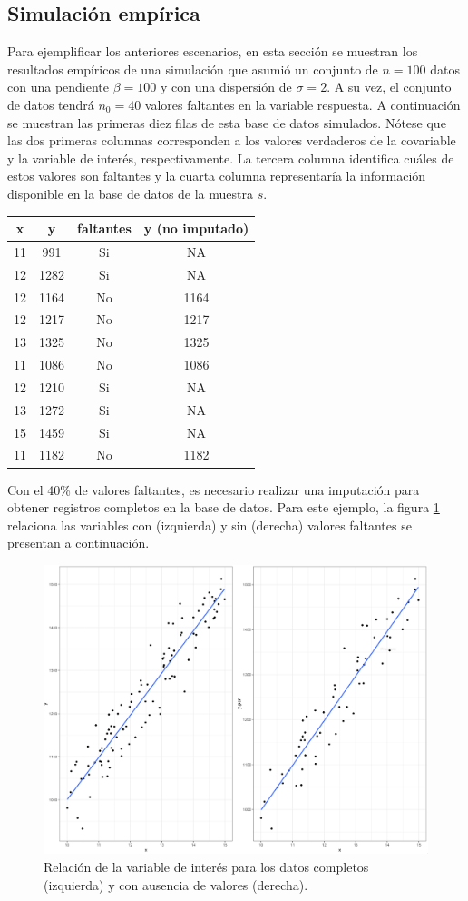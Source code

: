 \documentclass[
  12pt,
]{book}
\begin{document}
\hypertarget{simulaciuxf3n-empuxedrica}{%
\subsection{Simulación empírica}\label{simulaciuxf3n-empuxedrica}}

Para ejemplificar los anteriores escenarios, en esta sección se muestran los resultados empíricos de una simulación que asumió un conjunto de \(n = 100\) datos con una pendiente \(\beta = 100\) y con una dispersión de \(\sigma = 2\). A su vez, el conjunto de datos tendrá \(n_0 = 40\) valores faltantes en la variable respuesta. A continuación se muestran las primeras diez filas de esta base de datos simulados. Nótese que las dos primeras columnas corresponden a los valores verdaderos de la covariable y la variable de interés, respectivamente. La tercera columna identifica cuáles de estos valores son faltantes y la cuarta columna representaría la información disponible en la base de datos de la muestra \(s\).

\begin{longtable}[]{@{}cccc@{}}
\toprule()
x & y & faltantes & y (no imputado) \\
\midrule()
\endhead
11 & 991 & Si & NA \\
12 & 1282 & Si & NA \\
12 & 1164 & No & 1164 \\
12 & 1217 & No & 1217 \\
13 & 1325 & No & 1325 \\
11 & 1086 & No & 1086 \\
12 & 1210 & Si & NA \\
13 & 1272 & Si & NA \\
15 & 1459 & Si & NA \\
11 & 1182 & No & 1182 \\
\bottomrule()
\end{longtable}

Con el 40\% de valores faltantes, es necesario realizar una imputación para obtener registros completos en la base de datos. Para este ejemplo, la figura \ref{fig:figim1} relaciona las variables con (izquierda) y sin (derecha) valores faltantes se presentan a continuación.

\begin{figure}
\includegraphics[width=0.5\linewidth]{Pics/im1} \caption{Relación de la variable de interés para los datos completos (izquierda) y con ausencia de valores (derecha).}\label{fig:figim1}
\end{figure}
\end{document}
